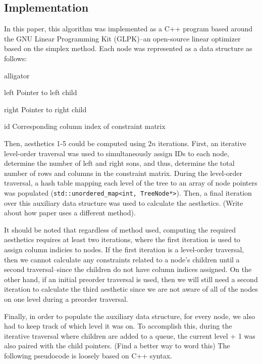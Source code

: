 \documentclass[11pt]{report}
\begin{document}
\subsection{Implementation}
In this paper, this algorithm was implemented as a C++ program based around the GNU Linear Programming Kit (GLPK)--an open-source linear optimizer based on the simplex method. Each node was represented as a data structure as follows:

\begin{labeling}{alligator}
    \item [left]  Pointer to left child
    \item [right] Pointer to right child
    \item [id]    Corresponding column index of constraint matrix
\end{labeling}

Then, aesthetics 1-5 could be computed using $2n$ iterations. First, an iterative level-order traversal was used to simultaneously assign IDs to each node, determine the number of left and right sons, and thus, determine the total number of rows and columns in the constraint matrix. During the level-order traversal, a hash table mapping each level of the tree to an array of node pointers was populated (\lstinline{std::unordered_map<int, TreeNode*>}). Then, a final iteration over this auxiliary data structure was used to calculate the aesthetics. (Write about how paper uses a different method).

\bigskip

It should be noted that regardless of method used, computing the required aesthetics requires at least two iterations, where the first iteration is used to assign column indicies to nodes. If the first iteration is a level-order traversal, then we cannot calculate any constraints related to a node's children until a second traversal--since the children do not have column indices assigned. On the other hand, if an initial preorder traversal is used, then we will still need a second iteration to calculate the third aesthetic since we are not aware of all of the nodes on one level during a preorder traversal.

\bigskip

Finally, in order to populate the auxiliary data structure, for every node, we also had to keep track of which level it was on. To accomplish this, during the iterative traversal where children are added to a queue, the current level + 1 was also paired with the child pointers. (Find a better way to word this) The following pseudocode is loosely based on C++ syntax.
\end{document}
